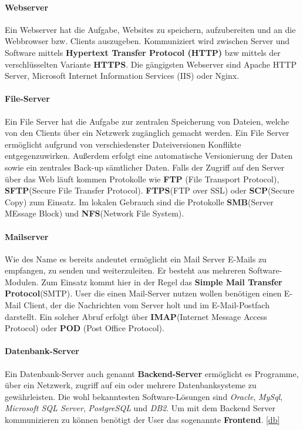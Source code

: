 \paragraph*{Webserver}
Ein Webserver hat die Aufgabe, Websites zu speichern, aufzubereiten und an die Webbrowser bzw. Clients
auszugeben. Kommuniziert wird zwischen Server und Software mittels \textbf{Hypertext Transfer Protocol
    (HTTP)} bzw mittels der verschlüsselten Variante \textbf{HTTPS}. Die gängigsten Webserver sind
Apache HTTP Server, Microsoft Internet Information Services (IIS) oder Nginx.

\paragraph{File-Server}
Ein File Server hat die Aufgabe zur zentralen Speicherung von Dateien, welche von den Clients
über ein Netzwerk zugänglich gemacht werden. Ein File Server ermöglicht aufgrund von verschiedenster
Dateiversionen Konflikte entgegenzuwirken. Außerdem erfolgt eine automatische Versionierung der
Daten sowie ein zentrales Back-up sämtlicher Daten. Falls der Zugriff auf den Server über das
Web läuft kommen Protokolle wie \textbf{FTP} (File Transport Protocol), \textbf{SFTP}(Secure File Transfer
Protocol). \textbf{FTPS}(FTP over SSL) oder \textbf{SCP}(Secure Copy) zum Einsatz. Im lokalen
Gebrauch sind die Protokolle \textbf{SMB}(Server MEssage Block) und \textbf{NFS}(Network File System).

\paragraph{Mailserver}
Wie des Name es bereits andeutet ermöglicht ein Mail Server E-Mails zu empfangen, zu senden und
weiterzuleiten. Er besteht aus mehreren Software-Modulen. Zum Einsatz kommt hier in der Regel
das \textbf{Simple Mail Transfer Protocol}(SMTP). User die einen Mail-Server nutzen
wollen benötigen einen E-Mail Client, der die Nachrichten vom Server holt und im E-Mail-Postfach
darstellt. Ein solcher Abruf erfolgt über \textbf{IMAP}(Internet Message Access Protocol) oder
\textbf{POD} (Post Office Protocol).

\paragraph{Datenbank-Server}
Ein Datenbank-Server auch genannt \textbf{Backend-Server} ermöglicht es Programme, über ein Netzwerk,
zugriff auf ein oder mehrere
Datenbanksysteme zu gewährleisten. Die wohl bekanntesten Software-Lösungen sind \textit{Oracle},
\textit{MySql}, \textit{Microsoft SQL Server}, \textit{PostgreSQL} und \textit{DB2}. Um mit dem
Backend Server kommunizieren zu können benötigt der User das sogenannte \textbf{Frontend}.
\ref{db}

